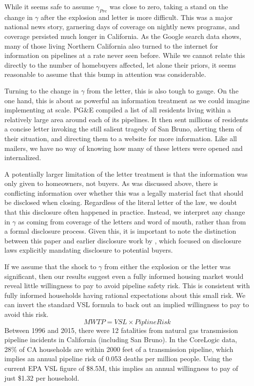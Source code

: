 \documentclass[12pt]{article}
\begin{document}
While it seems safe to assume $\gamma_{Pre}$ was close to zero, taking a stand on the change in $\gamma$ after the explosion and letter is more difficult. This was a major national news story, garnering days of coverage on nightly news programs, and coverage persisted much longer in California. As the Google search data shows, many of those living Northern California also turned to the internet for information on pipelines at a rate never seen before. While we cannot relate this directly to the number of homebuyers affected, let alone their priors, it seems reasonable to assume that this bump in attention was considerable. 

Turning to the change in $\gamma$ from the letter, this is also tough to gauge. On the one hand, this is about as powerful an information treatment as we could imagine implementing at scale. PG\&E compiled a list of all residents living within a relatively large area around each of its pipelines. It then sent millions of residents a concise letter invoking the still salient tragedy of San Bruno, alerting them of their situation, and directing them to a website for more information. Like all mailers, we have no way of knowing how many of these letters were opened and internalized. 

A potentially larger limitation of the letter treatment is that the information was only given to homeowners, not buyers. As was discussed above, there is conflicting information over whether this was a legally material fact that should be disclosed when closing. Regardless of the literal letter of the law, we doubt that this disclosure often happened in practice. Instead, we interpret any change in $\gamma$ as coming from coverage of the letters and word of mouth, rather than from a formal disclosure process. Given this, it is important to note the distinction between this paper and earlier disclosure work by \citet{pope_buyer_2008}, which focused on disclosure laws explicitly mandating disclosure to potential buyers.

If we assume that the shock to $\gamma$ from either the explosion or the letter was significant, then our results suggest even a fully informed housing market would reveal little willingness to pay to avoid pipeline safety risk. This is consistent with fully informed households having rational expectations about this small risk. We can invert the standard VSL formula to back out an implied willingness to pay to avoid this risk. 
\[
MWTP=VSL\times PiplineRisk
\]
Between 1996 and 2015, there were 12 fatalities from natural gas transmission pipeline incidents in California (including San Bruno). In the CoreLogic data, 28\% of CA households are within 2000 feet of a transmission
pipeline, which implies an annual pipeline risk of 0.053 deaths per million people. Using the current EPA VSL figure of \$8.5M, this implies an annual willingness to pay of just \$1.32 per household.
\end{document}
